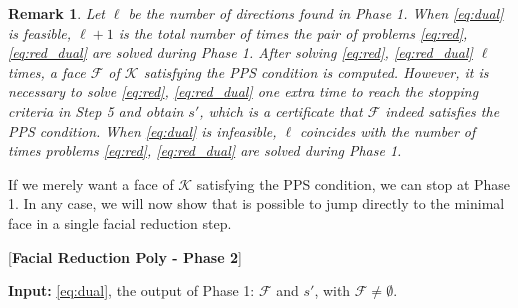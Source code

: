 \documentclass{article}
\newcommand{\reInt}{\mathrm{ri}\,}
\newcommand{\minFaceD}{ {\mathcal{F}_{\min}^D}}
\newcommand{\stdCone}{ {\mathcal{K}}}
\newcommand{\stdFace}{ \mathcal{F}}
\newcommand{\PPS}{{PPS}}
\newtheorem*{remark}{Remark}
\begin{document}
\begin{remark}
Let $\ell$ be the number of directions found in 
Phase 1. 
When \eqref{eq:dual} is feasible, $\ell + 1$ is the total number of times the pair of problems \eqref{eq:red}, \eqref{eq:red_dual} are solved during Phase 1. After solving \eqref{eq:red}, \eqref{eq:red_dual} $\ell$ times, a face $\stdFace$ of $\stdCone$ satisfying the {\PPS} condition is computed. 
However, it is necessary to solve \eqref{eq:red}, \eqref{eq:red_dual} one extra time to reach the stopping criteria in Step 5 and obtain $s'$, which is a certificate that $\stdFace$ indeed satisfies the {\PPS} condition. 
When \eqref{eq:dual} is infeasible, $\ell$ coincides with the 
number of times problems \eqref{eq:red}, \eqref{eq:red_dual} are solved during Phase 1.
\end{remark}
If we merely want a face of $\stdCone$ satisfying the {\PPS} condition, we can stop at Phase 1. 
In any case, we will now show that is possible to jump directly to the minimal face in a single facial reduction step. 

[{\bf Facial Reduction Poly - Phase 2}]

{\bf Input:} \eqref{eq:dual}, the output of Phase 1: $\stdFace$ and $s'$, with $\stdFace \neq \emptyset$.
\end{document}
